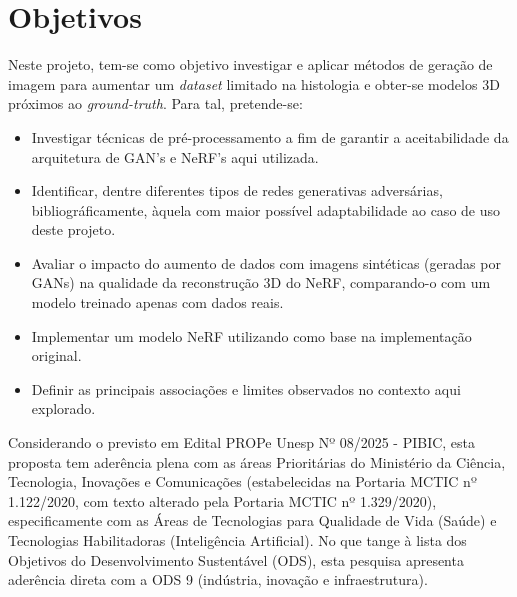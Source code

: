 \section{Objetivos}


Neste projeto, tem-se como objetivo investigar e aplicar métodos de geração de imagem para aumentar um \textit{dataset} limitado na histologia e obter-se modelos 3D próximos ao \textit{ground-truth}. Para tal, pretende-se:

\begin{itemize}
  \item Investigar técnicas de pré-processamento a fim de garantir a aceitabilidade da arquitetura de GAN's e NeRF's aqui utilizada. 
  \item Identificar, dentre diferentes tipos de redes generativas adversárias, bibliográficamente, àquela com maior possível adaptabilidade ao caso de uso deste projeto. 
  \item Avaliar o impacto do aumento de dados com imagens sintéticas (geradas por GANs) na qualidade da reconstrução 3D do NeRF, comparando-o com um modelo treinado apenas com dados reais.
  \item Implementar um modelo NeRF utilizando como base na implementação original.
  \item Definir as principais associações e limites observados no contexto aqui explorado.
\end{itemize}

%
%    
%
Considerando o previsto em Edital PROPe Unesp Nº 08/2025 - PIBIC, esta proposta tem aderência plena com as áreas Prioritárias do Ministério da Ciência, Tecnologia, Inovações e Comunicações (estabelecidas na Portaria MCTIC nº 1.122/2020, com texto alterado pela Portaria MCTIC nº 1.329/2020), especificamente com as Áreas de Tecnologias para Qualidade de Vida (Saúde) e Tecnologias Habilitadoras (Inteligência Artificial). No que tange à lista dos Objetivos do Desenvolvimento Sustentável (ODS), esta pesquisa apresenta aderência direta com a ODS 9 (indústria, inovação e infraestrutura).
